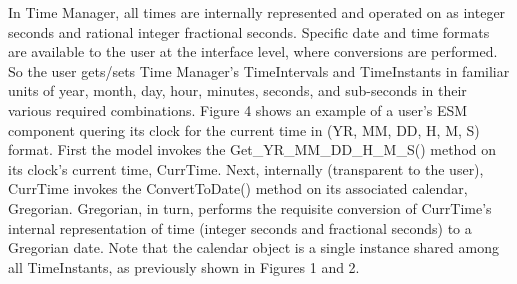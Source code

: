 

In Time Manager, all times are internally represented and operated on as
integer seconds and rational integer fractional seconds.  Specific date and
time formats are available to the user at the interface level, where
conversions are performed.  So the user gets/sets Time Manager's TimeIntervals
and TimeInstants in familiar units of year, month, day, hour, minutes,
seconds, and sub-seconds in their various required combinations.  Figure 4
shows an example of a user's ESM component quering its clock for the current
time in (YR, MM, DD, H, M, S) format.  First the model invokes the
Get\_YR\_MM\_DD\_H\_M\_S() method on its clock's current time, CurrTime.  Next,
internally (transparent to the user), CurrTime invokes the ConvertToDate()
method on its associated calendar, Gregorian.  Gregorian, in turn, performs
the requisite conversion of CurrTime's internal representation of time (integer
seconds and fractional seconds) to a Gregorian date.  Note that the calendar
object is a single instance shared among all TimeInstants, as previously shown
in Figures 1 and 2.

